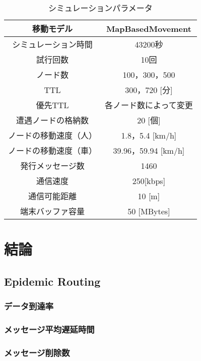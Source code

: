 \documentclass[11pt]{icsthesis}
\begin{document}
\begin{table}[h]
    \begin{center}
      \caption[]{シミュレーションパラメータ}
      \label{example:terminology}
      \begin{tabular}{|c|c|}
        \hline
        移動モデル & MapBasedMovement\\
        \hline
        シミュレーション時間 & 43200秒\\
        \hline
        試行回数 & 10回\\
        \hline
        ノード数 & 100，300，500\\
        \hline
        TTL & 300，720 [分]\\
        \hline
        優先TTL & 各ノード数によって変更\\
        \hline
        遭遇ノードの格納数 & 20 [個]\\
        \hline
        ノードの移動速度（人） & 1.8，5.4 [km/h]\\
        \hline
        ノードの移動速度（車） & 39.96，59.94 [km/h]\\
        \hline
        発行メッセージ数 & 1460\\
        \hline
        通信速度 & 250[kbps]\\
        \hline
        通信可能距離 & 10 [m]\\
        \hline
        端末バッファ容量 & 50 [MBytes]\\
        \hline
      \end{tabular}
    \end{center}
\end{table}

\chapter{結論}
\section{Epidemic Routing}
\subsection{データ到達率}
\subsection{メッセージ平均遅延時間}
\subsection{メッセージ削除数}
\end{document}
